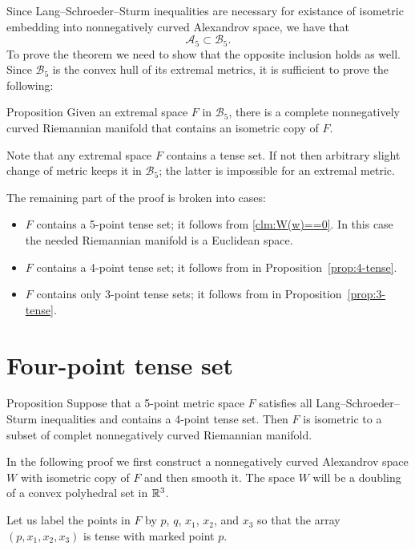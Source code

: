 \documentclass{article}
\begin{document}
Since Lang--Schroeder--Sturm inequalities are necessary for existance of isometric embedding into nonnegatively curved Alexandrov space,
we have that 
\[\mathcal{A}_5\subset\mathcal{B}_5.\]
To prove the theorem we need to show that the opposite inclusion holds as well.
Since $\mathcal{B}_5$ is the convex hull of its extremal metrics, it is sufficient to prove the following:

\begin{thm}{Proposition}\label{prop:main}
Given an extremal space $F$ in $\mathcal{B}_5$, there is a complete nonnegatively curved Riemannian manifold that contains an isometric copy of $F$.
\end{thm}

Note that any extremal space  $F$ contains a tense set.
If not then arbitrary slight change of metric keeps it in $\mathcal{B}_5$;
the latter is impossible for an extremal metric.

The remaining part of the proof is broken into cases:
\begin{itemize}
\item $F$ contains a 5-point  tense set; it follows from \ref{clm:W(w)==0}. In this case the needed Riemannian manifold is a Euclidean space.
\item $F$ contains a 4-point  tense set; it follows from in Proposition~\ref{prop:4-tense}.
\item $F$ contains only 3-point  tense sets; it follows from in Proposition~\ref{prop:3-tense}.
\qeds
\end{itemize}

\section{Four-point tense set}\label{sec:4-tense}

\begin{thm}{Proposition}\label{prop:4-tense}
Suppose that a 5-point metric space $F$ satisfies all Lang--Schroeder--Sturm inequalities and contains a 4-point tense set.
Then $F$ is isometric to a subset of complet nonnegatively curved Riemannian manifold. 
\end{thm}

In the following proof we first construct a nonnegatively curved Alexandrov space $W$ with isometric copy of $F$ and then smooth it.
The space $W$ will be a doubling of a convex polyhedral set in $\mathbb{R}^3$.

Let us label the points in $F$ by $p$, $q$, $x_1$, $x_2$, and $x_3$ so that the array $(p,x_1,x_2,x_3)$ is tense with marked point $p$.
\end{document}
